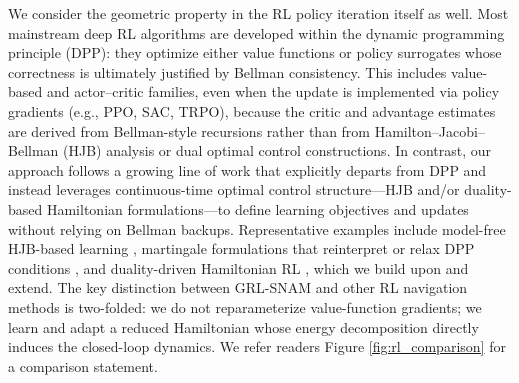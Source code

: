 \documentclass{article} %
\begin{document}
We consider the geometric property in the RL policy iteration itself as well. Most mainstream deep RL algorithms are developed within the dynamic programming principle (DPP): they optimize either value functions or policy surrogates whose correctness is ultimately justified by Bellman consistency. This includes value-based and actor–critic families, even when the update is implemented via policy gradients (e.g., PPO, SAC, TRPO), because the critic and advantage estimates are derived from Bellman-style recursions rather than from Hamilton–Jacobi–Bellman (HJB) analysis or dual optimal control constructions. In contrast, our approach follows a growing line of work that explicitly departs from DPP and instead leverages continuous-time optimal control structure—HJB and/or duality-based Hamiltonian formulations—to define learning objectives and updates without relying on Bellman backups. Representative examples include model-free HJB-based learning \citep{settai2025temporal}, martingale formulations that reinterpret or relax DPP conditions \citep{jia2023qlearning}, and duality-driven Hamiltonian RL \citep{dpo}, which we build upon and extend. The key distinction between GRL-SNAM and other RL navigation methods is two-folded: we do not reparameterize value-function gradients; we learn and adapt a reduced Hamiltonian whose energy decomposition directly induces the closed-loop dynamics. We refer readers Figure \ref{fig:rl_comparison} for a comparison statement.
\end{document}

